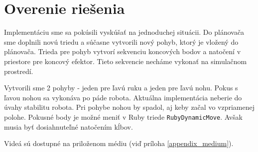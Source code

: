 \section{Overenie riešenia}

Implementáciu sme sa pokúsili vyskúšať na jednoduchej situácii. Do plánovača sme doplnili novú triedu a súčasne vytvorili nový pohyb, ktorý je vložený do plánovača. Trieda pre pohyb vytvorí sekvenciu koncových bodov a natočení v priestore pre koncový efektor. Tieto sekvencie necháme vykonať na simulačnom prostredí.

Vytvorili sme 2 pohyby - jeden pre ľavú ruku a jeden pre ľavú nohu. Pokus s ľavou nohou sa vykonáva po páde robota. Aktuálna implementácia neberie do úvahy stabilitu robota. Pri pohybe nohou by spadol, aj keby začal vo vzpriamenej polohe. Pokusné body je možné meniť v Ruby triede \texttt{RubyDynamicMove}. Avšak musia byť dosiahnuteľné natočením kĺbov. 

Videá sú dostupné na priloženom médiu (viď príloha \ref{appendix_medium}).